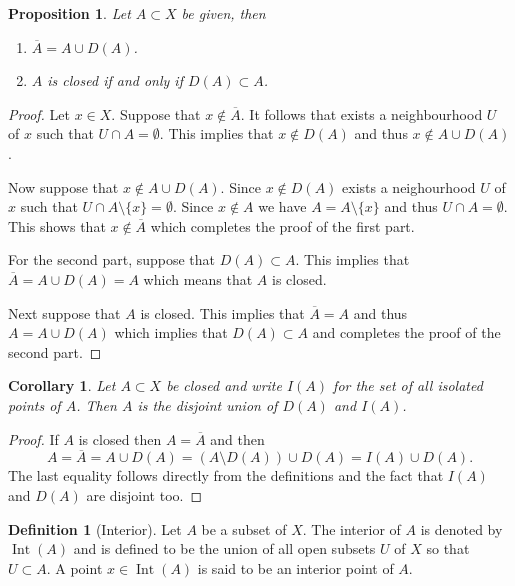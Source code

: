 \documentclass[11pt,a4paper]{article}
\theoremstyle{definition}
\newtheorem{definition}{Definition}[section]
\theoremstyle{plain}
\newtheorem{proposition}[theorem]{Proposition}
\newtheorem{corollary}[theorem]{Corollary}
\DeclareMathOperator{\Int}{Int}
\begin{document}
  \begin{proposition}
    Let $A \subset X$ be given, then
    \begin{enumerate}
      \item $\overline{A} = A \cup D(A)$.
      \item $A$ is closed if and only if $D(A) \subset A$.
    \end{enumerate}
  \end{proposition}
  \begin{proof}
    Let $x \in X$. Suppose that $x \notin \overline A$. It follows that
    exists a neighbourhood $U$ of $x$ such that $U \cap A = \emptyset$.
    This implies that $x \notin D(A)$ and thus $x \notin A \cup D(A)$.

    Now suppose that $x \notin A \cup D(A)$. Since $x \notin D(A)$ exists
    a neighourhood $U$ of $x$ such that $U \cap A \setminus \{x\} = \emptyset$.
    Since $x \notin A$ we have $A = A \setminus \{x\}$ and thus
    $U \cap A = \emptyset$. This shows that $x \notin \overline A$ which
    completes the proof of the first part.

    For the second part, suppose that $D(A) \subset A$. This implies
    that $\overline A = A \cup D(A) = A$ which means that $A$ is closed.

    Next suppose that $A$ is closed. This implies that $\overline A = A$ and
    thus $A = A \cup D(A)$ which implies that $D(A) \subset A$ and completes
    the proof of the second part.
  \end{proof}

  \begin{corollary}
    Let $A \subset X$ be closed and write $I(A)$ for the set of all isolated
    points of $A$. Then $A$ is the disjoint union of $D(A)$ and $I(A)$.
  \end{corollary}
  \begin{proof}
    If $A$ is closed then $A = \overline A$ and then
    \[
      A = \overline A = A \cup D(A) = \left(A \setminus D(A)\right) \cup D(A) =
      I(A) \cup D(A).
    \]
    The last equality follows directly from the definitions and the fact
    that $I(A)$ and $D(A)$ are disjoint too.
  \end{proof}

  \begin{definition}[Interior]
    Let $A$ be a subset of $X$. The interior of $A$ is denoted by $\Int(A)$
    and is defined to be the union of all open subsets $U$ of $X$ so that 
    $U \subset A$. A point $x \in \Int(A)$ is said to be an interior point 
    of $A$.
  \end{definition}
\end{document}
